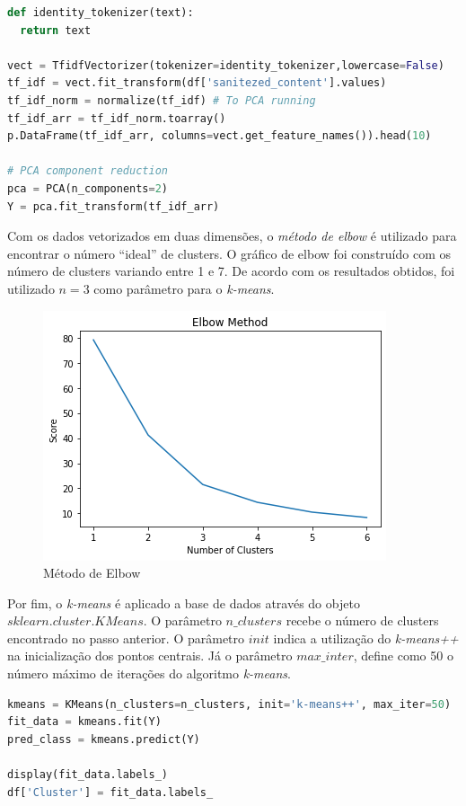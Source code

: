 \begin{lstlisting}[language=Python, caption=Vetorização dos dados]
def identity_tokenizer(text):
  return text

vect = TfidfVectorizer(tokenizer=identity_tokenizer,lowercase=False)
tf_idf = vect.fit_transform(df['sanitezed_content'].values)
tf_idf_norm = normalize(tf_idf) # To PCA running
tf_idf_arr = tf_idf_norm.toarray()
p.DataFrame(tf_idf_arr, columns=vect.get_feature_names()).head(10)

# PCA component reduction
pca = PCA(n_components=2)
Y = pca.fit_transform(tf_idf_arr)
\end{lstlisting}

Com os dados vetorizados em duas dimensões, o \emph{método de elbow} é utilizado para encontrar o número ``ideal'' de clusters.
O gráfico de elbow foi construído com os número de clusters variando entre 1 e 7. 
De acordo com os resultados obtidos, foi utilizado $n=3$ como parâmetro para o \emph{k-means}.

 \begin{figure}[H]
   \centering
   \includegraphics[scale=0.75]{figs/elbowgraph.png}
    \caption{Método de Elbow}
    \label{fig:melbow}
 \end{figure}

Por fim, o \emph{k-means} é aplicado a base de dados através do objeto $sklearn.cluster.KMeans$.
O parâmetro $n\_clusters$ recebe o número de clusters encontrado no passo anterior. 
O parâmetro $init$ indica a utilização do \emph{k-means++} na inicialização dos pontos centrais.
Já o parâmetro  $max\_inter$, define como 50 o número máximo de iterações do algoritmo \emph{k-means}.

\begin{lstlisting}[language=Python, caption=Vetorização dos dados]
kmeans = KMeans(n_clusters=n_clusters, init='k-means++', max_iter=50)
fit_data = kmeans.fit(Y)
pred_class = kmeans.predict(Y)

display(fit_data.labels_)
df['Cluster'] = fit_data.labels_
\end{lstlisting}

